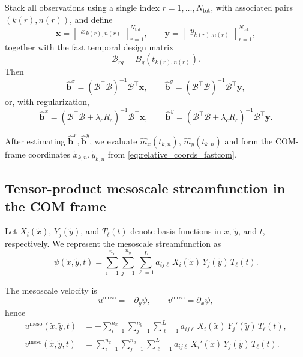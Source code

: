 Stack all observations using a single index $r=1,\dots,N_{\mathrm{tot}}$, with associated
pairs $(k(r),n(r))$, and define
\begin{equation}
\mathbf{x}=
\begin{bmatrix}
x_{k(r),n(r)}
\end{bmatrix}_{r=1}^{N_{\mathrm{tot}}},
\qquad
\mathbf{y}=
\begin{bmatrix}
y_{k(r),n(r)}
\end{bmatrix}_{r=1}^{N_{\mathrm{tot}}},
\end{equation}
together with the fast temporal design matrix
\begin{equation}
\mathcal{B}_{rq}=B_q\!\left(t_{k(r),n(r)}\right).
\label{eq:B_design_matrix}
\end{equation}
Then
\begin{equation}
\hat{\mathbf{b}}^x=(\mathcal{B}^\top\mathcal{B})^{-1}\mathcal{B}^\top\mathbf{x},
\qquad
\hat{\mathbf{b}}^y=(\mathcal{B}^\top\mathcal{B})^{-1}\mathcal{B}^\top\mathbf{y},
\label{eq:com_fast_coeff_est}
\end{equation}
or, with regularization,
\begin{equation}
\hat{\mathbf{b}}^x=(\mathcal{B}^\top\mathcal{B}+\lambda_c R_c)^{-1}\mathcal{B}^\top\mathbf{x},
\qquad
\hat{\mathbf{b}}^y=(\mathcal{B}^\top\mathcal{B}+\lambda_c R_c)^{-1}\mathcal{B}^\top\mathbf{y}.
\end{equation}

After estimating $\hat{\mathbf{b}}^x,\hat{\mathbf{b}}^y$, we evaluate
$\hat{m}_x(t_{k,n})$, $\hat{m}_y(t_{k,n})$ and form the COM-frame coordinates
$\tilde{x}_{k,n},\tilde{y}_{k,n}$ from \eqref{eq:relative_coords_fastcom}.

\subsection{Tensor-product mesoscale streamfunction in the COM frame}

Let $X_i(\tilde{x})$, $Y_j(\tilde{y})$, and $T_\ell(t)$ denote basis functions in
$\tilde{x}$, $\tilde{y}$, and $t$, respectively. We represent the mesoscale streamfunction as
\begin{equation}
\psi(\tilde{x},\tilde{y},t)
=
\sum_{i=1}^{n_x}\sum_{j=1}^{n_y}\sum_{\ell=1}^{L}
a_{ij\ell}\,
X_i(\tilde{x})\,Y_j(\tilde{y})\,T_\ell(t).
\label{eq:psi_slow_meso}
\end{equation}

The mesoscale velocity is
\begin{equation}
u^{\mathrm{meso}}=-\partial_{\tilde{y}}\psi,
\qquad
v^{\mathrm{meso}}=\partial_{\tilde{x}}\psi,
\end{equation}
hence
\begin{align}
u^{\mathrm{meso}}(\tilde{x},\tilde{y},t)
&=
-\sum_{i=1}^{n_x}\sum_{j=1}^{n_y}\sum_{\ell=1}^{L}
a_{ij\ell}\,
X_i(\tilde{x})\,Y_j'(\tilde{y})\,T_\ell(t),
\label{eq:u_meso_slow}
\\
v^{\mathrm{meso}}(\tilde{x},\tilde{y},t)
&=
\sum_{i=1}^{n_x}\sum_{j=1}^{n_y}\sum_{\ell=1}^{L}
a_{ij\ell}\,
X_i'(\tilde{x})\,Y_j(\tilde{y})\,T_\ell(t).
\label{eq:v_meso_slow}
\end{align}

